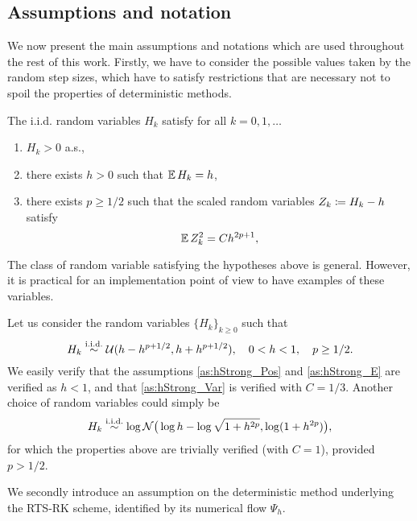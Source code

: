 \documentclass[10pt]{article}
\begin{document}
\subsection{Assumptions and notation} We now present the main assumptions and notations which are used throughout the rest of this work. Firstly, we have to consider the possible values taken by the random step sizes, which have to satisfy restrictions that are necessary not to spoil the properties of deterministic methods. 
\begin{assumption}\label{as:hStrong} The i.i.d. random variables $H_k$ satisfy for all $k = 0, 1, \ldots$
	\begin{enumerate}
		\item\label{as:hStrong_Pos} $H_k > 0$ a.s.,
		\item\label{as:hStrong_E} there exists $h > 0$ such that $\operatorname{\mathbb{E}} H_k = h$,
		\item\label{as:hStrong_Var} there exists $p \geq 1/2$ such that the scaled random variables $Z_k \coloneqq H_k - h$ satisfy
		\begin{equation}
			\operatorname{\mathbb{E}} Z_k^2 = Ch^{2p+1},
		\end{equation}
	\end{enumerate}
\end{assumption}
The class of random variable satisfying the hypotheses above is general. However, it is practical for an implementation point of view to have examples of these variables.
\begin{example}\label{ex:uniformH} Let us consider the random variables $\{H_k\}_{k\geq 0}$ such that
	\begin{equation}
	H_k \stackrel{\text{i.i.d.}}{\sim} \mathcal{U}(h-h^{p+1/2}, h+h^{p+1/2}), \quad 0 < h < 1, \quad p \geq 1/2.
	\end{equation}
	We easily verify that the assumptions \ref{as:hStrong_Pos} and \ref{as:hStrong_E} are verified as $h < 1$, and that \ref{as:hStrong_Var} is verified with $C = 1/3$. Another choice of random variables could simply be 
	\begin{equation}\label{eq:logNormalH}
	H_k \stackrel{\text{i.i.d.}}{\sim} \log\mathcal{N}\big(\log h - \log\sqrt{1 + h^{2p}}, \log(1 + h^{2p})\big),
	\end{equation}
	for which the properties above are trivially verified (with $C = 1$), provided $p > 1/2$.
\end{example}
We secondly introduce an assumption on the deterministic  method underlying the RTS-RK scheme, identified by its numerical flow $\Psi_h$. 
\end{document}
